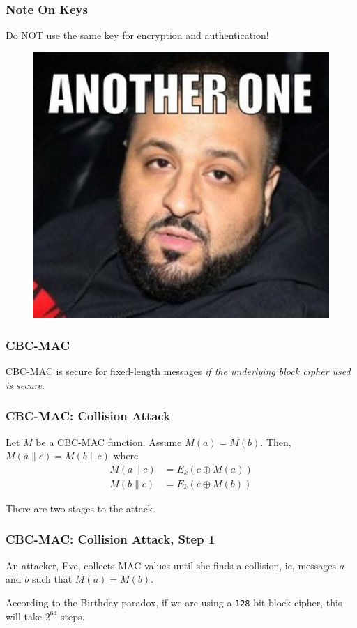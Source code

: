 \documentclass{beamer}
\newcommand{\<}{\langle}
\renewcommand{\>}{\rangle}
\begin{document}
\begin{frame}
\frametitle{Note On Keys}

Do NOT use the same key for encryption and authentication!

\begin{figure}
\includegraphics[scale=.4]{IMG/anotherone}
\end{figure}
\end{frame}


\begin{frame}
\frametitle{CBC-MAC}

CBC-MAC is secure for fixed-length messages \emph{if the underlying block cipher used is secure}.
\end{frame}


\begin{frame}
\frametitle{CBC-MAC: Collision Attack}

Let $M$ be a CBC-MAC function. Assume $M(a) = M(b)$. Then, $M(a\| c) = M(b\| c)$ where
\begin{align*}
M(a\| c) &= E_k(c\oplus M(a))\\
M(b\| c) &= E_k(c\oplus M(b))
\end{align*}

There are two stages to the attack.
\end{frame}

\begin{frame}[fragile]
\frametitle{CBC-MAC: Collision Attack, Step 1}

An attacker, Eve, collects MAC values until she finds a collision, ie, messages $a$ and $b$ such that $M(a) = M(b)$.\newline

According to the Birthday paradox, if we are using a \verb|128|-bit block cipher, this will take $2^{64}$ steps. 
\end{frame}
\end{document}

